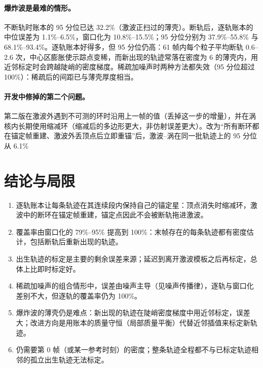 \paragraph{爆炸波是最难的情形。}不断轨时账本的 95 分位已达 32.2\%（激波正扫过的薄壳）。断轨后，逐轨账本的中位误差为 1.1\%–6.5\%，窗口化为 10.8\%–15.5\%；95 分位分别为 37.9\%–55.8\% 与 68.1\%–93.4\%。逐轨账本好得多，但 95 分位仍高：61 帧内每个粒子平均断轨 0.6–2.6 次，中心区膨胀使示踪点变稀，而新出现的轨迹常落在密度为 6 的薄壳内，用近邻标定时会跨越陡峭的密度梯度。稀疏加噪声时两种方法都失效（95 分位超过 100\%）：稀疏后的间距已与薄壳厚度相当。
\paragraph{开发中修掉的第二个问题。}第二版在激波外遇到不可测的环时沿用上一帧的值（丢掉这一步的增量），并在涡核内长期使用缩减环（缩减后的多边形更大，非仿射误差更大）。改为“所有断环都在锚定帧重建、激波外丢顶点后立即重锚”后，激波–涡在同一批轨迹上的 95 分位从 6.1\%%
\section{结论与局限}
\begin{enumerate}
\item 逐轨账本让每条轨迹在其连续段内保持自己的锚定星：顶点消失时缩减环，激波中的断环在锚定帧重建，锚定点因此不会被断轨拖进激波。
\item 覆盖率由窗口化的 79\%–95\% 提高到 100\%：末帧存在的每条轨迹都有密度估计，包括断轨后重新出现的轨迹。
\item 出生轨迹的标定是主要的剩余误差来源；延迟到离开激波模板之后再标定，总体上比即时标定好。
\item 稀疏加噪声的组合情形中，误差由噪声主导（见噪声传播律），逐轨与窗口化差别不大，但逐轨的覆盖率仍为 100\%。
\item 爆炸波的薄壳仍是难点：新出现的轨迹在陡峭密度梯度中用近邻标定，误差大；改进方向是用账本的质量守恒（局部质量平衡）代替近邻插值来标定新轨迹。
\item 仍需要第 0 帧（或某一参考时刻）的密度；整条轨迹全程都不与已标定轨迹相邻的孤立出生轨迹无法标定。
\end{enumerate}

